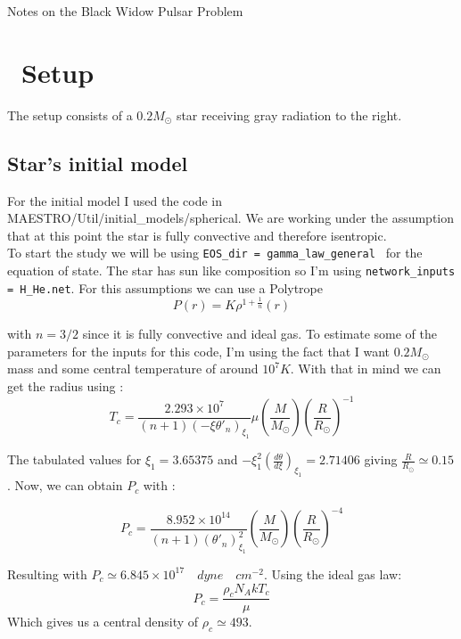 \documentclass[11pt]{article}
\newcommand{\castro}{{\sffamily{Castro}}}
\begin{document}
\begin{center}
  {\Large Notes on the Black Widow Pulsar Problem}
\end{center}

\section{\castro\ Setup}
The setup consists of a $0.2 M_\odot$ star receiving gray radiation to the right. 

\subsection{Star's initial model}
For the initial model I used the code in MAESTRO/Util/initial\_models/spherical. We are working under the assumption that at this point the star is fully convective and therefore isentropic.\\

To start the study we will be using {\tt EOS\_dir = gamma\_law\_general } for the equation of state. The star has sun like composition so I'm using {\tt network\_inputs = H\_He.net}. For this assumptions we can use a Polytrope
\begin{equation}
	P(r) = K \rho^{1+\frac{1}{n}}(r)
\end{equation}

with $n=3/2$ since it is fully convective and ideal gas. To estimate some of the parameters for the inputs for this code, I'm using the fact that I want $0.2 M_\odot$ mass and some central temperature of around $10^7 K$. With that in mind we can get the radius using \cite{hansen2004stellar}:
\begin{equation}
	T_c = \frac{2.293 \times 10^7}{(n+1)(-\xi \theta'_n)_{\xi _1}} \mu \left(\frac{M}{M_\odot}\right)\left(\frac{R}{R_\odot}\right)^{-1} 
\end{equation}

The tabulated values for $\xi_1 = 3.65375$ and $-\xi_1^2 \left(\frac{d\theta}{d\xi}\right)_{\xi _1} = 2.71406$ giving $\frac{R}{R_\odot} \simeq 0.15$. Now, we can obtain $P_c$ with :

\begin{equation}
	P_c = \frac{8.952 \times 10^{14}}{(n+1)(\theta'_n)^2_{\xi _1}} \left(\frac{M}{M_\odot}\right)\left(\frac{R}{R_\odot}\right)^{-4}
\end{equation}

Resulting with $P_c \simeq 6.845 \times 10^{17} \quad dyne \quad cm^{-2}$. Using the ideal gas law: 
\begin{equation}
	P_c = \frac{\rho_c N_A k T_c}{\mu}
\end{equation}
Which gives us a central density of $\rho_c \simeq 493$.\\
\end{document}
